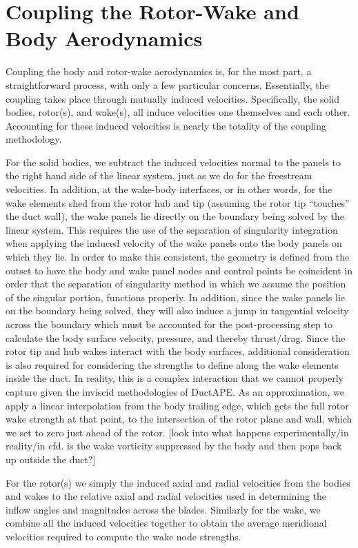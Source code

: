 

\section{Coupling the Rotor-Wake and Body Aerodynamics}

Coupling the body and rotor-wake aerodynamics is, for the most part, a straightforward process, with only a few particular concerns.
%
Essentially, the coupling takes place through mutually induced velocities.
%
Specifically, the solid bodies, rotor(s), and wake(s), all induce velocities one themselves and each other.
%
Accounting for these induced velocities is nearly the totality of the coupling methodology.


For the solid bodies, we subtract the induced velocities normal to the panels to the right hand side of the linear system, just as we do for the freestream velocities.
%
In addition, at the wake-body interfaces, or in other words, for the wake elements shed from the rotor hub and tip (assuming the rotor tip ``touches'' the duct wall), the wake panels lie directly on the boundary being solved by the linear system.
%
This requires the use of the separation of singularity integration when applying the induced velocity of the wake panels onto the body panels on which they lie.
%
In order to make this consistent, the geometry is defined from the outset to have the body and wake panel nodes and control points be coincident in order that the separation of singularity method in which we assume the position of the singular portion, functions properly.
%
In addition, since the wake panels lie on the boundary being solved, they will also induce a jump in tangential velocity across the boundary which must be accounted for the post-processing step to calculate the body surface velocity, pressure, and thereby thrust/drag.
%
Since the rotor tip and hub wakes interact with the body surfaces, additional consideration is also required for considering the strengths to define along the wake elements inside the duct.
%
In reality, this is a complex interaction that we cannot properly capture given the inviscid methodologies of DuctAPE.
%
As an approximation, we apply a linear interpolation from the body trailing edge, which gets the full rotor wake strength at that point, to the intersection of the rotor plane and wall, which we set to zero just ahead of the rotor.
%
[look into what happens experimentally/in reality/in cfd.  is the wake vorticity suppressed by the body and then pops back up outside the duct?]



For the rotor(s) we simply the induced axial and radial velocities from the bodies and wakes to the relative axial and radial velocities used in determining the inflow angles and magnitudes across the blades.
%
Similarly for the wake, we combine all the induced velocities together to obtain the average meridional velocities required to compute the wake node strengths.

